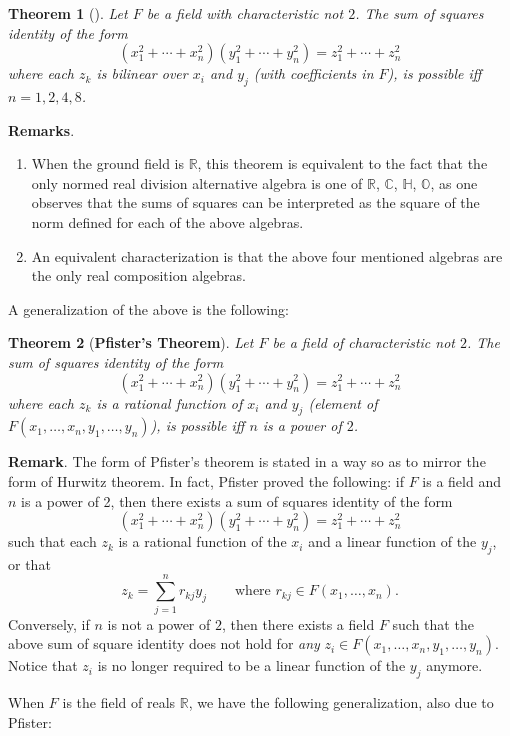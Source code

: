 \documentclass[12pt]{article}
\theoremstyle{theorem}
\newtheorem*{thm}{Theorem}
\begin{document}
\begin{thm}[]  Let $F$ be a field with
characteristic not $2$.  The sum of squares identity of the form
$$(x_1^2+\cdots+x_n^2)(y_1^2+\cdots+y_n^2)=z_1^2+\cdots+z_n^2$$
where each $z_k$ is bilinear over $x_i$ and $y_j$ (with coefficients
in $F$), is possible iff $n=1,2,4,8$.
\end{thm}

\textbf{Remarks}.
\begin{enumerate}
\item When the ground field is $\mathbb{R}$, this theorem is equivalent to the fact that the only normed real division alternative algebra is one of $\mathbb{R}$, $\mathbb{C}$, $\mathbb{H}$, $\mathbb{O}$, as one observes that the sums of squares can be interpreted as the square of the norm defined for each of the above algebras.
\item An equivalent characterization is that the above four mentioned algebras are the only real composition algebras.
\end{enumerate}

A generalization of the above is the following:

\begin{thm}[{\textbf{Pfister's Theorem}}]  Let $F$ be a field of
characteristic not $2$.  The sum of squares identity of the form
$$(x_1^2+\cdots+x_n^2)(y_1^2+\cdots+y_n^2)=z_1^2+\cdots+z_n^2$$
where each $z_k$ is a rational function of $x_i$ and $y_j$ (element
of $F(x_1,\ldots,x_n,y_1,\ldots,y_n)$), is possible iff $n$ is a
power of $2$.
\end{thm}

\textbf{Remark}.  The form of Pfister's theorem is stated in a way
so as to mirror the form of Hurwitz theorem.  In fact, Pfister
proved the following:  if $F$ is a field and $n$ is a power of 2,
then there exists a sum of squares identity of the form
$$(x_1^2+\cdots+x_n^2)(y_1^2+\cdots+y_n^2)=z_1^2+\cdots+z_n^2$$ such
that each $z_k$ is a rational function of the $x_i$ and a linear
function of the $y_j$, or that
$$z_k=\sum_{j=1}^{n}r_{kj}y_j\qquad\mbox{where }r_{kj}\in
F(x_1,\ldots,x_n).$$  Conversely, if $n$ is not a power of $2$, then
there exists a field $F$ such that the above sum of square identity
does not hold for \emph{any} $z_i\in
F(x_1,\ldots,x_n,y_1,\ldots,y_n)$.  Notice that $z_i$ is no longer
required to be a linear function of the $y_j$ anymore.

When $F$ is the field of reals $\mathbb{R}$, we have the following
generalization, also due to Pfister:
\end{document}
